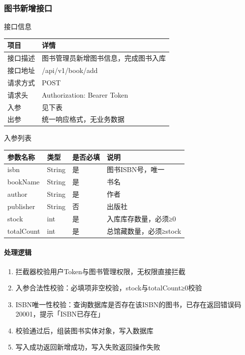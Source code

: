 \documentclass[12pt, a4paper]{article}
\begin{document}
\subsubsection{图书新增接口}
\begin{center}
    接口信息
\end{center}

\begin{table}[H]
    \centering
    \begin{tabular}{|l|l|}
        \hline
        项目 & 详情 \\
        \hline
        接口描述 & 图书管理员新增图书信息，完成图书入库 \\
        \hline
        接口地址 & /api/v1/book/add \\
        \hline
        请求方式 & POST \\
        \hline
        请求头 & Authorization: Bearer {Token} \\
        \hline
        入参 & 见下表 \\
        \hline
        出参 & 统一响应格式，无业务数据 \\
        \hline
    \end{tabular}
\end{table}

入参列表

\begin{table}[H]
    \centering
    \begin{tabular}{|l|l|l|l|}
        \hline
        参数名称 & 类型 & 是否必填 & 说明 \\
        \hline
        isbn & String & 是 & 图书ISBN号，唯一 \\
        \hline
        bookName & String & 是 & 书名 \\
        \hline
        author & String & 是 & 作者 \\
        \hline
        publisher & String & 否 & 出版社 \\
        \hline
        stock & int & 是 & 入库库存数量，必须≥0 \\
        \hline
        totalCount & int & 是 & 总馆藏数量，必须≥stock \\
        \hline
    \end{tabular}
\end{table}

\paragraph{处理逻辑}
\begin{enumerate}
\item 拦截器校验用户Token与图书管理权限，无权限直接拦截

\item 入参合法性校验：必填项非空校验，stock与totalCount≥0校验

\item ISBN唯一性校验：查询数据库是否存在该ISBN的图书，已存在返回错误码20001，提示「ISBN已存在」

\item 校验通过后，组装图书实体对象，写入数据库

\item 写入成功返回新增成功，写入失败返回操作失败
\end{enumerate}
\end{document}
